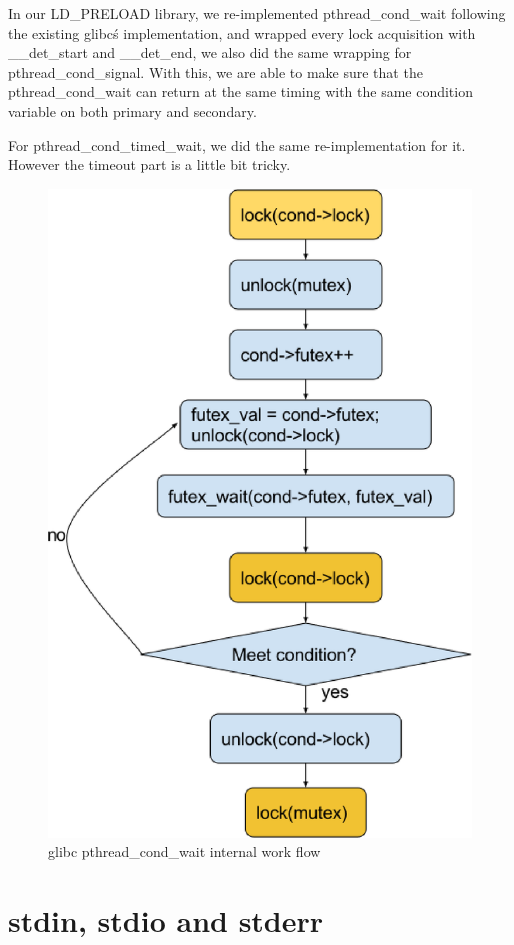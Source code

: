 \newpage

In our LD\_PRELOAD library, we re-implemented pthread\_cond\_wait following the existing glibc\'s implementation, and wrapped every lock acquisition with \_\_det\_start and \_\_det\_end, we also did the same wrapping for pthread\_cond\_signal. With this, we are able to make sure that the pthread\_cond\_wait can return at the same timing with the same condition variable on both primary and secondary.

For pthread\_cond\_timed\_wait, we did the same re-implementation for it. However the timeout part is a little bit tricky. %

\begin{figure}
\centering
\includegraphics[width=0.4\columnwidth]{figures/cond_wait}
\caption{glibc pthread\_cond\_wait internal work flow}
\label{f:cond_wait}
\end{figure}

\section{stdin, stdio and stderr} \label{sec:stdxxx}

